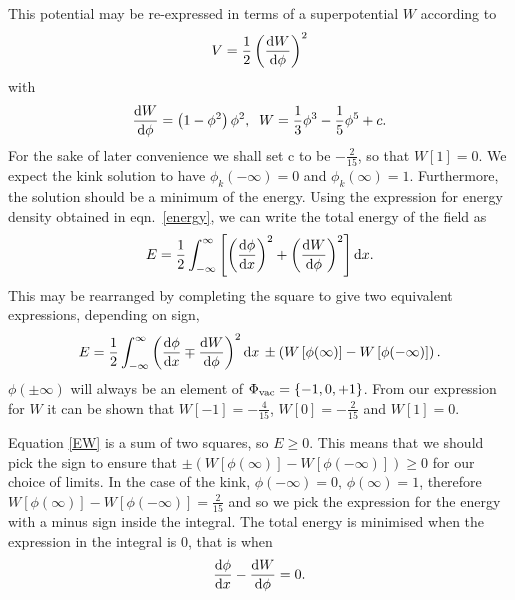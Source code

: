 \documentclass[11pt, oneside]{article}  	%
\numberwithin{equation}{section}
\newcommand{\drv}{\ensuremath{\textup{d}}}
\begin{document}
 This potential may be re-expressed in terms of a superpotential $W$ according to
 \begin{equation}
 V = \frac{1}{2} \left ( \frac{\textup{d}W}{\textup{d}\phi}\right )^2
 \end{equation}
 with
 \begin{equation}\label{dw}
 \frac{\textup{d}W}{\textup{d}\phi} = \left ( 1 - \phi^2 \right ) \phi^2 ,\; \;W = \frac{1}{3}\phi^3 - \frac{1}{5}\phi^5 +c.
 \end{equation}
For the sake of later convenience we shall set c to be $-\frac{2}{15}$, so that $W[1]=0$. We expect the kink solution to have $\phi_k (-\infty )= 0$ and $\phi_k (\infty )= 1$. Furthermore, the solution should be a minimum of the energy. Using the expression for energy density obtained in eqn.~\ref{energy}, we can write the total energy of the field as
 \begin{equation}\label{EW}
E = \frac{1}{2} \int_{-\infty}^{\infty} \left [ \left(\frac{\textup{d}\phi}{\textup{d}x}\right)^2 + \left(\frac{\textup{d}W}{\textup{d}\phi}\right)^2 \right ]\drv x.
 \end{equation}
 This may be rearranged by completing the square to give two equivalent expressions, depending on sign,
 \begin{equation}\label{energy_bogo}
E = \frac{1}{2} \int_{-\infty}^{\infty}\left (  \frac{\textup{d}\phi}{\textup{d}x} \mp \frac{\textup{d}W}{\textup{d}\phi} \right )^2 \drv x  \, \pm \left( W\left [  \phi(\infty)\right ]  -  W\left [  \phi(-\infty)\right ]\right).
 \end{equation}
$\phi(\pm\infty)$ will always be an element of $\Phi_{\textup{vac}} = \left \{ -1,0,+1\right \}$. From our expression for $W$ it can be shown that $W[-1] = -\frac{4}{15}$, $W[0] = -\frac{2}{15}$ and $W[1] = 0$.\par
 Equation \ref{EW} is a sum of two squares, so $E\geqslant 0$. This means that we should pick the sign to ensure that $ \pm \left( W\left [  \phi(\infty)\right ]  -  W\left [  \phi(-\infty)\right ]\right) \geqslant 0$ for our choice of limits. In the case of the kink, $\phi(-\infty) = 0,\, \phi(\infty) = 1 $, therefore $W\left [  \phi(\infty)\right ]  -  W\left [  \phi(-\infty)\right ] = \frac{2}{15}$ and so we pick the expression for the energy with a minus sign inside the integral. The total energy is minimised when the expression in the integral is 0, that is when
 \begin{equation}\label{bogo}
 \frac{\textup{d}\phi}{\textup{d}x} - \frac{\textup{d}W}{\textup{d}\phi} = 0.
 \end{equation}
\end{document}
